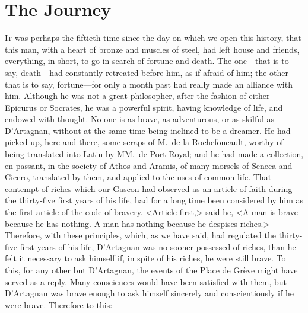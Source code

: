 \chapter{The Journey}

\lettrine{I}{t} was perhaps the fiftieth time since the day on which we open this history, that this man, with a heart of bronze and muscles of steel, had left house and friends, everything, in short, to go in search of fortune and death. The one—that is to say, death—had constantly retreated before him, as if afraid of him; the other—that is to say, fortune—for only a month past had really made an alliance with him. Although he was not a great philosopher, after the fashion of either Epicurus or Socrates, he was a powerful spirit, having knowledge of life, and endowed with thought. No one is as brave, as adventurous, or as skilful as D'Artagnan, without at the same time being inclined to be a dreamer. He had picked up, here and there, some scraps of M.~de la Rochefoucault, worthy of being translated into Latin by MM.~de Port Royal; and he had made a collection, en passant, in the society of Athos and Aramis, of many morsels of Seneca and Cicero, translated by them, and applied to the uses of common life. That contempt of riches which our Gascon had observed as an article of faith during the thirty-five first years of his life, had for a long time been considered by him as the first article of the code of bravery. <Article first,> said he, <A man is brave because he has nothing. A man has nothing because he despises riches.> Therefore, with these principles, which, as we have said, had regulated the thirty-five first years of his life, D'Artagnan was no sooner possessed of riches, than he felt it necessary to ask himself if, in spite of his riches, he were still brave. To this, for any other but D'Artagnan, the events of the Place de Grève might have served as a reply. Many consciences would have been satisfied with them, but D'Artagnan was brave enough to ask himself sincerely and conscientiously if he were brave. Therefore to this:—

